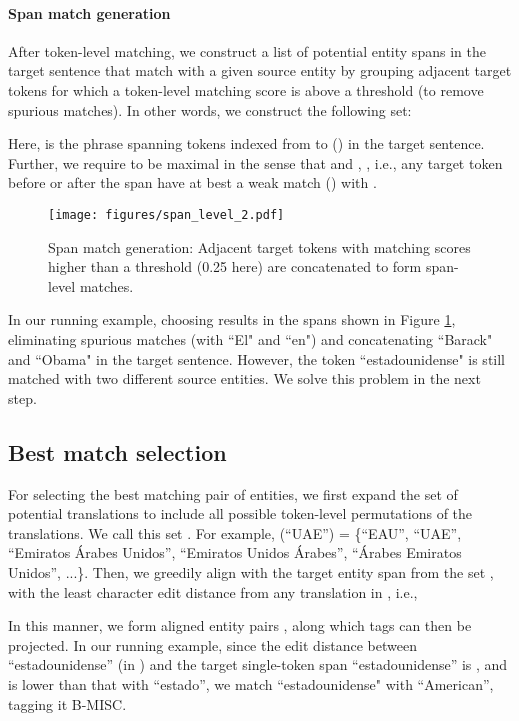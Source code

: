 \documentclass[11pt,a4paper]{article}
\begin{document}
\paragraph{Span match generation \label{sec:span-match}}
After token-level matching, we construct a list 
of potential entity spans in the target sentence 
that match with a given source entity  
by grouping adjacent target tokens for which a token-level matching score  is above a threshold  (to remove spurious matches).
In other words, we construct the following set:

Here,  
is the phrase spanning tokens indexed from  to  
() in the target sentence.
Further, we require  to be maximal 
in the sense that  and , , i.e., 
any target token before or after the span 
have at best a weak match () with .

\begin{figure}[htb]
    \centering
    \texttt{[image: figures/span\_level\_2.pdf]}
    \caption{Span match generation: Adjacent target tokens with matching scores higher than a threshold (0.25 here) are concatenated to form span-level matches.}
\label{fig:span-level}
\end{figure}



In our running example, choosing  
results in the spans shown in Figure \ref{fig:span-level}, 
eliminating spurious matches (with ``El" and ``en") 
and concatenating ``Barack" and ``Obama" in the target sentence. 
However, the token ``estadounidense" is still matched 
with two different source entities. 
We solve this problem in the next step.



\subsection{Best match selection \label{sec:best-match-select}}
For selecting the best matching pair of entities, 
we first expand the set of potential translations 
to include all possible token-level permutations of the translations. 
We call this set . For example, (``UAE'') = \{``EAU'', ``UAE'', ``Emiratos \'Arabes Unidos'', ``Emiratos Unidos \'Arabes'', ``\'Arabes Emiratos Unidos'', ...\}.
Then, we greedily align  with the target entity span from the set , 
with the least character edit distance  
from any translation in , i.e.,

In this manner, we form 
aligned entity pairs , 
along which tags can then be projected. 
In our running example, since the edit distance between ``estadounidense'' 
(in ) and the target single-token span ``estadounidense'' is , 
and is lower than that with ``estado'', 
we match ``estadounidense" with ``American'', tagging it B-MISC.
\end{document}
